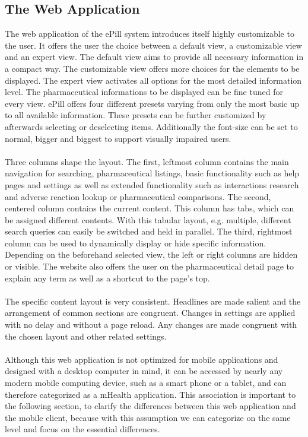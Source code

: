 \subsection{The Web Application}
The web application of the ePill system introduces itself highly customizable to the user. It offers the user the choice between a default view, a customizable view and an expert view. The default view aims to provide all necessary information in a compact way. The customizable view offers more choices for the elements to be displayed. The expert view activates all options for the most detailed information level. The pharmaceutical informations to be displayed can be fine tuned for every view. ePill offers four different presets varying from only the most basic up to all available information. These presets can be further customized by afterwards selecting or deselecting items. Additionally the font-size can be set to normal, bigger and biggest to support visually impaired users.
\\
\\
Three columns shape the layout. The first, leftmost column contains the main navigation for searching, pharmaceutical listings, basic functionality such as help pages and settings as well as extended functionality such as interactions research and adverse reaction lookup or pharmaceutical comparisons. The second, centered column contains the current content. This column has tabs, which can be assigned different contents. With this tabular layout, e.g. multiple, different search queries can easily be switched and held in parallel. The third, rightmost column can be used to dynamically display or hide specific information. Depending on the beforehand selected view, the left or right columns are hidden or visible. The website also offers the user on the pharmaceutical detail page to explain any term as well as a shortcut to the page's top.
\\
\\
The specific content layout is very consistent. Headlines are made salient and the arrangement of common sections are congruent. Changes in settings are applied with no delay and without a page reload. Any changes are made congruent with the chosen layout and other related settings.
\\
\\
Although this web application is not optimized for mobile applications and designed with a desktop computer in mind, it can be accessed by nearly any modern mobile computing device, such as a smart phone or a tablet, and can therefore categorized as a mHealth application. This association is important to the following section, to clarify the differences between this web application and the mobile client, because with this assumption we can categorize on the same level and focus on the essential differences.